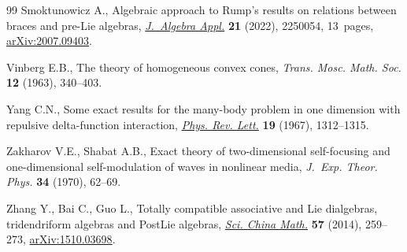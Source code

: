 \documentclass[10pt,a4paper]{amsart}
\numberwithin{equation}{section}
\theoremstyle{definition}
\begin{document}
\begin{thebibliography}{99}
Smoktunowicz A., Algebraic approach to {R}ump's results on relations between
 braces and pre-{L}ie algebras,
 \href{https://doi.org/10.1142/S0219498822500542}{\textit{J.~Algebra Appl.}}
 \textbf{21} (2022), 2250054, 13~pages,
 \href{http://arxiv.org/abs/2007.09403}{arXiv:2007.09403}.

Vinberg E.B., The theory of homogeneous convex cones, \textit{Trans. Mosc.
 Math. Soc.} \textbf{12} (1963), 340--403.

Yang C.N., Some exact results for the many-body problem in one dimension with
 repulsive delta-function interaction,
 \href{https://doi.org/10.1103/PhysRevLett.19.1312}{\textit{Phys. Rev. Lett.}}
 \textbf{19} (1967), 1312--1315.

Zakharov V.E., Shabat A.B., Exact theory of two-dimensional self-focusing and
 one-dimensional self-modulation of waves in nonlinear media, \textit{J.~Exp.
 Theor. Phys.} \textbf{34} (1970), 62--69.

Zhang Y., Bai C., Guo L., Totally compatible associative and {L}ie dialgebras,
 tridendriform algebras and {P}ost{L}ie algebras,
 \href{https://doi.org/10.1007/s11425-013-4756-0}{\textit{Sci. China Math.}}
 \textbf{57} (2014), 259--273,
 \href{http://arxiv.org/abs/1510.03698}{arXiv:1510.03698}.

\end{thebibliography}
\end{document}
